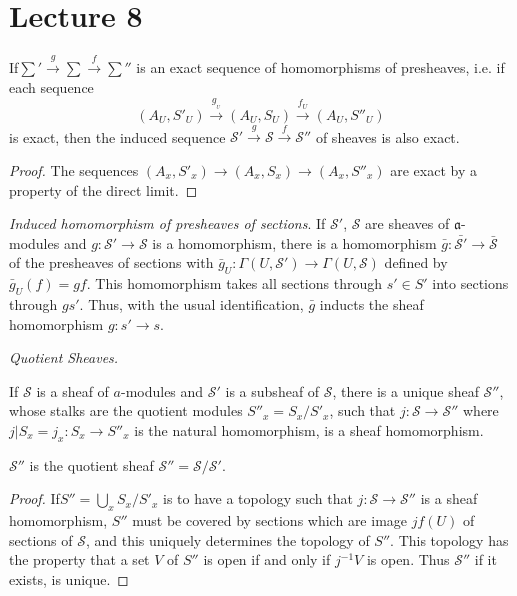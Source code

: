 \chapter{Lecture 8}

\begin{proposition}%
 If\pageoriginale $\sum' \xrightarrow{g} \sum \xrightarrow{f} \sum''$ is an
  exact sequence of homomorphisms of presheaves, i.e. if each
  sequence 
$$
(A_U, S'_U) \xrightarrow{g_{_U}} (A_U , S_U) \xrightarrow{f_U} (A_U,
  S''_U) 
$$
is exact, then the induced sequence $\mathscr{S}' \xrightarrow{g} 
\mathscr{S} \xrightarrow{f}\mathscr{S}''$ of sheaves is also exact. 
\end{proposition}

\begin{proof}
The sequences $(A_x, S'_x) \to (A_x, S_x) \to (A_x, S''_x)$ are exact
by a property of the direct limit. 
\end{proof}

\textit{Induced homomorphism of presheaves of sections}. If
$\mathscr{S}'$, $\mathscr{S}$ are sheaves of $\mathfrak{a}$-modules and $g :
\mathscr{S}' \to \mathscr{S}$ is a homomorphism, there is a
homomorphism $\bar{g} : \bar{\mathscr{S}'} \to \bar{\mathscr{S}}$ of
the presheaves of sections with $\bar{g}_U : \Gamma (U,\mathscr{S}')
\to \Gamma (U,\mathscr{S})$ defined by $\bar{g}_U(f) = gf$. This
homomorphism takes all sections through $s' \in S'$ into sections
through $g s'$. Thus, with the usual identification, $\bar{g}$ inducts
the sheaf homomorphism $g:s'\to s$.

\noindent
\textit{Quotient Sheaves.} 

\begin{proposition}%
If $\mathscr{S}$ is a sheaf of $a$-modules and $\mathscr{S}'$ is
  a subsheaf of $\mathscr{S}$, there is a unique sheaf
  $\mathscr{S}''$, whose stalks are the quotient modules $S''_x =
S_x/S'_x$, such that $j : \mathscr{S} \to \mathscr{S}''$ where
  $j|S_x = j_x : S_x \to S''_x$ is the natural homomorphism, is a
  sheaf homomorphism. 

$\mathscr{S}''$ is the quotient sheaf $\mathscr{S}''
  =\mathscr{S}/ \mathscr{S}'$. 
\end{proposition}

\begin{proof}
If\pageoriginale $S'' = \bigcup_x S_x / S'_x$ is to have a topology such that $j :
\mathscr{S} \to \mathscr{S}''$ is a sheaf homomorphism, $S''$ must be
covered by sections which are image $jf(U)$ of sections of
$\mathscr{S}$, and this uniquely determines the topology of
$S''$. This topology has the property that a set $V$ of $S''$ is open
if and only if $j^{-1}V$ is open. Thus $\mathscr{S}''$ if it exists,
is unique. 
\end{proof}

